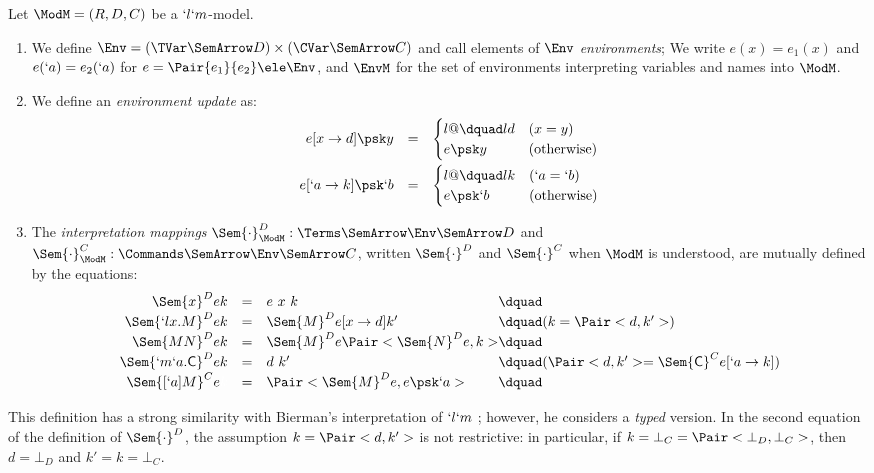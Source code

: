 \documentclass{lmcs}
\begin{document}
 \begin{defi} \label{def:interpretation} 
Let ${\ModM}=(R,D,C)$ be a $ `l`m$-model.

 \begin{enumerate}

 \item
We define $\Env = (\TVar \SemArrow D) \times (\CVar \SemArrow C)$ and call elements of $\Env$ \emph{environments}; 
We write $e(x) = e_1(x)$ and $e(`a) = e_2(`a)$ for $e = \Pair{e_1}{e_2} \ele \Env$, and $\EnvM$ for the set of environments interpreting variables and names into $\ModM$.

 \item
We define an \emph{environment update} as: 
%
 \[ \begin{array}{rcl}
e [x\to d] \psk y & = & 
 \begin{cases}{l@{\dquad}l}
d & (x = y) \\
e \psk y & (\textrm{otherwise})
 \end{cases}
 \\ [4mm]
e [`a\to k] \psk `b & = & 
 \begin{cases}{l@{\dquad}l}
k & (`a = `b) \\
e \psk `b & (\textrm{otherwise})
 \end{cases}
 \end{array} \]

 \item
The \emph{interpretation mappings}
$ \Sem{ \cdot}_{\ModM}^{D }: \Terms \SemArrow \Env \SemArrow D$ and
$ \Sem{ \cdot}_{\ModM}^{C}: \Commands \SemArrow \Env \SemArrow C$, written $\Sem{ \cdot}^D$ and $\Sem{ \cdot}^C$ when $\ModM$ is understood, are mutually defined by the equations:
%
 \[ \def\arraystretch{1.2} \begin{array}{rcl@{\dquad}l}
 \Sem{ x}^D{ e }{ k }
	&=& e ~ x ~ k \\
 \Sem{ `lx.M}^D{ e }{ k }
	&=& \Sem{ M }^D{ e[x \to d] }{ k' } & (k = \Pair<d,k'>) \\
 \Sem{ MN }^D { e }{ k }
	&=& \Sem{ M }^D{ e }{ \Pair<\Sem{ N }^D { e } , k > } \\
 \Sem{ `m`a.\Cmd}^D{ e }{ k }
	&=& d ~ k' & (\Pair<d , k'> = \Sem{ \Cmd}^C{ e[`a \to k]}) \\
 \Sem{ [`a]M}^C{ e }{ \textcolor{white}{ k }}
	&=& \Pair<\Sem{ M }^D { e } , e \psk `a >
 \end{array} \]

 \end{enumerate}
 \end{defi}
This definition has a strong similarity with Bierman's interpretation of $`l`m$ \cite{Bierman'98}; however, he considers a \emph{typed} version.
In the second equation of the definition of $ \Sem{ \cdot}^D$, the assumption $k = \Pair<d,k'>$ is not restrictive: in particular, if $k = \bot_C = \Pair<\bot_D , \bot_C>$, then $d = \bot_D$ and $k' = k = \bot_C$.
\end{document}
